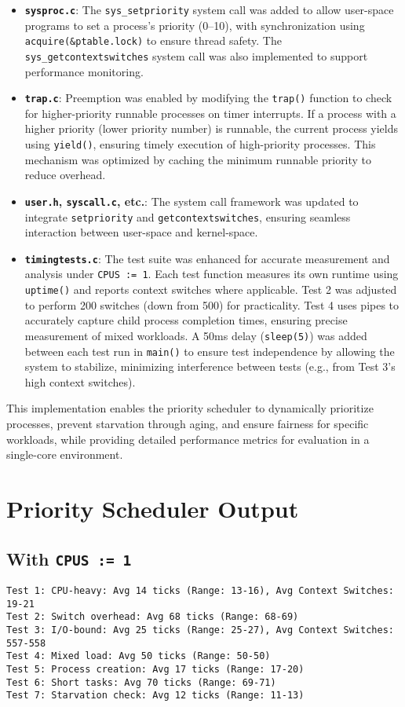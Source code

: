 \documentclass{article}
\begin{document}
\begin{itemize}
    \item \textbf{\texttt{sysproc.c}}: The \texttt{sys\_setpriority} system call was added to allow user-space programs to set a process’s priority (0–10), with synchronization using \texttt{acquire(&ptable.lock)} to ensure thread safety. The \texttt{sys\_getcontextswitches} system call was also implemented to support performance monitoring.
    
    \item \textbf{\texttt{trap.c}}: Preemption was enabled by modifying the \texttt{trap()} function to check for higher-priority runnable processes on timer interrupts. If a process with a higher priority (lower priority number) is runnable, the current process yields using \texttt{yield()}, ensuring timely execution of high-priority processes. This mechanism was optimized by caching the minimum runnable priority to reduce overhead.
    
    \item \textbf{\texttt{user.h}, \texttt{syscall.c}, etc.}: The system call framework was updated to integrate \texttt{setpriority} and \texttt{getcontextswitches}, ensuring seamless interaction between user-space and kernel-space.
    
    \item \textbf{\texttt{timingtests.c}}: The test suite was enhanced for accurate measurement and analysis under \texttt{CPUS := 1}. Each test function measures its own runtime using \texttt{uptime()} and reports context switches where applicable. Test 2 was adjusted to perform 200 switches (down from 500) for practicality. Test 4 uses pipes to accurately capture child process completion times, ensuring precise measurement of mixed workloads. A 50ms delay (\texttt{sleep(5)}) was added between each test run in \texttt{main()} to ensure test independence by allowing the system to stabilize, minimizing interference between tests (e.g., from Test 3’s high context switches).
\end{itemize}

This implementation enables the priority scheduler to dynamically prioritize processes, prevent starvation through aging, and ensure fairness for specific workloads, while providing detailed performance metrics for evaluation in a single-core environment.

\section{Priority Scheduler Output}
\subsection{With \texttt{CPUS := 1}}
\begin{lstlisting}
Test 1: CPU-heavy: Avg 14 ticks (Range: 13-16), Avg Context Switches: 19-21
Test 2: Switch overhead: Avg 68 ticks (Range: 68-69)
Test 3: I/O-bound: Avg 25 ticks (Range: 25-27), Avg Context Switches: 557-558
Test 4: Mixed load: Avg 50 ticks (Range: 50-50)
Test 5: Process creation: Avg 17 ticks (Range: 17-20)
Test 6: Short tasks: Avg 70 ticks (Range: 69-71)
Test 7: Starvation check: Avg 12 ticks (Range: 11-13)
\end{lstlisting}
\end{document}
